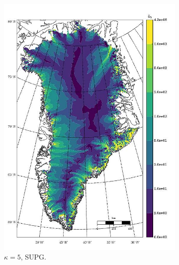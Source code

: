 \begin{figure}
\begin{subfigure}[b]{0.25\linewidth}
    \includegraphics[width=\linewidth]{images/balance_velocity/greenland/d_U_ob/Ubar_5H_kappa_5_SUPG.jpg}
  \caption{$\kappa = 5$, SUPG.}
  \label{greenland_bv_image_d_U_ob_kappa_5_SUPG}
  \end{subfigure}
  \begin{subfigure}[b]{0.25\linewidth}

\end{subfigure}
\end{figure}
